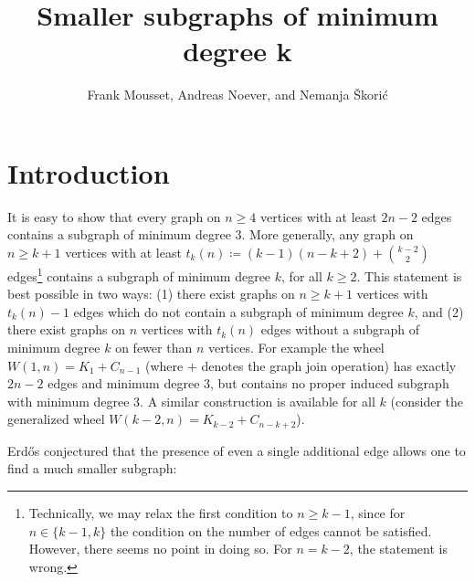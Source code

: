 \documentclass[11pt]{article}
\title{Smaller subgraphs of minimum degree k}
\author[ ]{Frank Mousset,
Andreas Noever, and
Nemanja \v{S}korić}
\affil[ ]{\small Department of Computer Science }
\affil[ ]{ETH Z\"urich, 8092 Z\"urich, Switzerland }
\affil[ ]{\tt {\{moussetf,anoever,nskoric\}@inf.ethz.ch}}
\numberwithin{theorem}{section}
\begin{document}
\maketitle


\section{Introduction}

It is easy to show that every graph on $n\geq 4$ vertices with at least $2n-2$
edges contains a subgraph of minimum degree $3$. More generally, any graph on
$n\geq k+1$ vertices with at least $t_k(n)\coloneqq
(k-1)(n-k+2)+\binom{k-2}{2}$ edges\footnote{Technically, we may relax the first
condition to $n\geq k-1$, since for $n\in \{k-1,k\}$ the condition on the
number of edges cannot be satisfied. However, there seems no point in doing so.
For $n=k-2$, the statement is wrong.} contains a subgraph of minimum degree $k$,
for all $k\geq 2$. This statement is best possible in two ways: (1) there exist
graphs on $n\geq k+1$ vertices with $t_k(n)-1$ edges which do not contain a
subgraph of minimum degree $k$, and (2) there exist graphs on $n$ vertices with
$t_k(n)$ edges without a subgraph of minimum degree $k$ on fewer than $n$ vertices.
For example the wheel $W(1,n)=K_1+C_{n-1}$ (where $+$ denotes the graph join operation)  has exactly $2n-2$ edges and minimum
degree $3$, but contains no proper induced subgraph with minimum degree $3$. A
similar construction is available for all $k$ (consider the generalized wheel
$W(k-2,n) = K_{k-2}+C_{n-k+2}$).

Erdős conjectured that the presence of even a single additional edge allows one
to find a much smaller subgraph:
\end{document}
